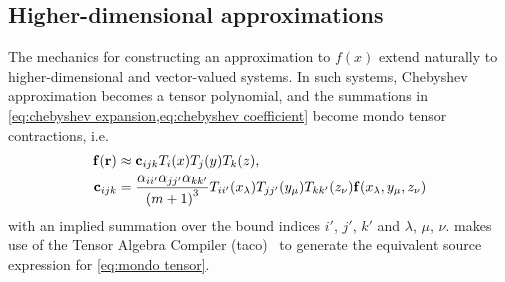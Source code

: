 \subsection{Higher-dimensional approximations}
The mechanics for constructing an approximation to $f(x)$ extend naturally to higher-dimensional and vector-valued systems.
In such systems, Chebyshev approximation becomes a tensor polynomial,
and the summations in \cref{eq:chebyshev expansion,eq:chebyshev coefficient} become mondo tensor contractions, i.e.
\begin{subequations}
  \begin{align}
    \vb{f}(\vb{r}) &\approx \vb{c}_{ijk} T_i(x) T_j(y) T_k(z), \\
    \vb{c}_{ijk} &= \frac{\alpha_{ii'} \alpha_{jj'} \alpha_{kk'}}{\qty(m+1)^3} T_{ii'}(x_\lambda) T_{jj'}(y_\mu) T_{kk'}(z_\nu) \vb{f}(x_\lambda, y_\mu, z_\nu) \label{eq:mondo tensor}
  \end{align}
\end{subequations}
with an implied summation over the bound indices $i'$, $j'$, $k'$ and $\lambda$, $\mu$, $\nu$.
\QuEST{} makes use of the Tensor Algebra Compiler (taco)~\cite{taco} to generate the equivalent source expression for \cref{eq:mondo tensor}.

